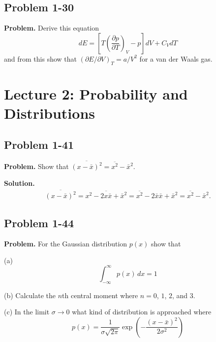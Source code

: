 \documentclass[twocolumn, 10pt]{article}
\numberwithin{equation}{section}
\newenvironment{problem}
{\par\medskip\sffamily \color{problue}
  \textbf{Problem. }\ignorespaces}
{\medskip}
\newenvironment{solution}
{\par\medskip
  \textbf{Solution. }\ignorespaces}
{\medskip}
\begin{document}
\subsection{Problem 1-30}

\begin{problem}
  Derive this equation
  $$
  dE = \left[ T \left( \frac{ \partial p} {\partial T } \right)_V - p \right]
  dV + C_V dT
  $$
  and from this show that $(\partial E/\partial V)_T = a/V^2$
  for a van der Waals gas.
\end{problem}

\section{Lecture 2: Probability and Distributions}

\subsection{Problem 1-41}

\begin{problem}
  Show that $\overline{ (x - \bar x)^2 } = \overline{ x^2 } - \bar x^2$.
\end{problem}

\begin{solution}
\begin{align*}
  \overline{ (x - \bar x)^2 }
  =
  \overline{ x^2  - 2 x \bar x + {\bar x}^2 }
  =
  \overline{ x^2 } - 2 \bar x \bar x + {\bar x}^2
  =
  \overline{ x^2 }  - {\bar x}^2.
\end{align*}
\end{solution}

\subsection{Problem 1-44}

\begin{problem}
  For the Gaussian distribution $p(x)$ show that

  (a)
  $$\int_{-\infty}^\infty p(x) \, dx  = 1$$

  (b)
  Calculate the $n$th central moment
  where $n = 0$, $1$, $2$, and $3$.

  (c)
  In the limit $\sigma \to 0$
  what kind of distribution is approached where
  $$
  p(x) = \frac{1}{\sigma \sqrt{2\pi}}
  \exp\left( -\frac{ (x -\bar x)^2 } { 2 \sigma^2} \right)
  $$
\end{problem}
\end{document}
